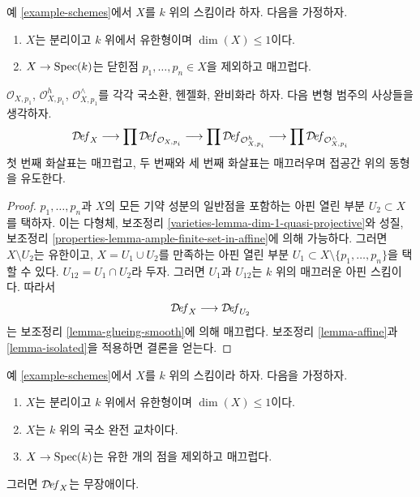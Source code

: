 \begin{lemma}
\label{lemma-curve-isolated}
예 \ref{example-schemes}에서 $X$를 $k$ 위의 스킴이라 하자. 다음을 가정하자.
\begin{enumerate}
\item $X$는 분리이고 $k$ 위에서 유한형이며 $\dim(X) \leq 1$이다.
\item $X \to \mathop{\mathrm{Spec}}(k)$는 닫힌점 $p_1, \ldots, p_n \in X$을 제외하고
매끄럽다.
\end{enumerate}
$\mathcal{O}_{X, p_1}$, $\mathcal{O}_{X, p_1}^h$,
$\mathcal{O}_{X, p_1}^\wedge$를 각각 국소환, 헨젤화, 완비화라 하자.%
다음 변형 범주의 사상들을 생각하자.
$$
\mathcal{D}\!\mathit{ef}_X
\longrightarrow
\prod \mathcal{D}\!\mathit{ef}_{\mathcal{O}_{X, p_i}}
\longrightarrow
\prod \mathcal{D}\!\mathit{ef}_{\mathcal{O}_{X, p_i}^h}
\longrightarrow
\prod \mathcal{D}\!\mathit{ef}_{\mathcal{O}_{X, p_i}^\wedge}
$$
첫 번째 화살표는 매끄럽고, 두 번째와 세 번째 화살표는 매끄러우며
접공간 위의 동형을 유도한다.
\end{lemma}

\begin{proof}
$p_1, \ldots, p_n$과 $X$의 모든 기약 성분의 일반점을 포함하는 아핀
열린 부분 $U_2 \subset X$를 택하자. 이는 다형체, 보조정리
\ref{varieties-lemma-dim-1-quasi-projective}와 성질, 보조정리
\ref{properties-lemma-ample-finite-set-in-affine}에 의해 가능하다. 그러면
$X \setminus U_2$는 유한이고, $X = U_1 \cup U_2$를 만족하는 아핀 열린
부분 $U_1 \subset X \setminus \{p_1, \ldots, p_n\}$을 택할 수 있다.
$U_{12} = U_1 \cap U_2$라 두자. 그러면 $U_1$과 $U_{12}$는 $k$ 위의
매끄러운 아핀 스킴이다. 따라서
$$
\mathcal{D}\!\mathit{ef}_X \longrightarrow \mathcal{D}\!\mathit{ef}_{U_2}
$$
는 보조정리 \ref{lemma-glueing-smooth}에 의해 매끄럽다. 보조정리
\ref{lemma-affine}과 \ref{lemma-isolated}을 적용하면 결론을 얻는다.
\end{proof}

\begin{lemma}
\label{lemma-curve-isolated-lci}
예 \ref{example-schemes}에서 $X$를 $k$ 위의 스킴이라 하자. 다음을 가정하자.
\begin{enumerate}
\item $X$는 분리이고 $k$ 위에서 유한형이며 $\dim(X) \leq 1$이다.
\item $X$는 $k$ 위의 국소 완전 교차이다.
\item $X \to \mathop{\mathrm{Spec}}(k)$는 유한 개의 점을 제외하고 매끄럽다.
\end{enumerate}
그러면 $\mathcal{D}\!\mathit{ef}_X$는 무장애이다.
\end{lemma}

